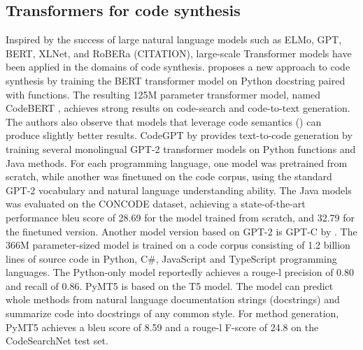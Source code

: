 \subsection{Transformers for code synthesis}
\label{sec:transformers-for-code-synthesis}
Inspired by the success of large natural language models such as ELMo, GPT, BERT, XLNet, and RoBERa (CITATION), large-scale Transformer models have been applied in the domains of code synthesis. \textcite{feng2020codebert} proposes a new approach to code synthesis by training the BERT transformer model on Python \gls{docstring} paired with functions. The resulting 125M parameter transformer model, named CodeBERT \cite{feng2020codebert}, achieves strong results on code-search and code-to-text generation. The authors also observe that models that leverage code semantics () can produce slightly better results. CodeGPT by \cite{lu2021codexglue} provides text-to-code generation by training several monolingual GPT-2 transformer models on Python functions and Java methods. For each programming language, one model was pretrained from scratch, while another was finetuned on the code corpus, using the standard GPT-2 vocabulary and natural language understanding ability. The Java models was evaluated on the CONCODE  dataset, achieving a state-of-the-art performance \acrshort{bleu} score \cite{papineni2002bleu} of 28.69 for the model trained from scratch, and 32.79 for the finetuned version. Another model version based on GPT-2 is GPT-C by \textcite{svyatkovskiy2020intellicode}. The 366M parameter-sized model is trained on a code corpus consisting of 1.2 billion lines of source code in Python, C\#, JavaScript and TypeScript programming languages. The Python-only model reportedly achieves a \gls{rouge-l} precision of 0.80 and recall of 0.86. PyMT5 \textcite{colin2020pymt5} is based on the T5 model. The model can predict whole methods from natural language documentation strings (docstrings) and summarize code into docstrings of any common style. For method generation, PyMT5 achieves a \gls{bleu} score of 8.59 and a \gls{rouge-l} F-score of 24.8 on the CodeSearchNet  test set.

